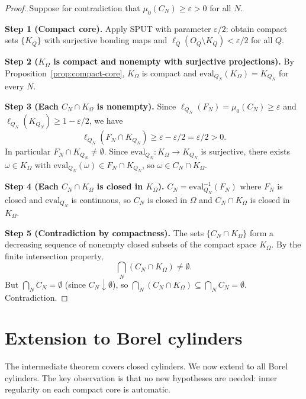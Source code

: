 \documentclass[11pt]{article}
\theoremstyle{definition}
\begin{document}
\begin{proof}
Suppose for contradiction that $\mu_0(C_N) \geq \varepsilon > 0$
for all $N$.

\textbf{Step 1 (Compact core).}
Apply SPUT with parameter $\varepsilon/2$: obtain compact sets
$\{K_Q\}$ with surjective bonding maps and $\ell_Q(O_Q \setminus
K_Q) < \varepsilon/2$ for all $Q$.

\textbf{Step 2 ($K_\Omega$ is compact and nonempty with surjective
projections).}
By Proposition~\ref{prop:compact-core}, $K_\Omega$ is compact and
$\mathrm{eval}_{Q_N}(K_\Omega) = K_{Q_N}$ for every $N$.

\textbf{Step 3 (Each $C_N \cap K_\Omega$ is nonempty).}
Since $\ell_{Q_N}(F_N) = \mu_0(C_N) \geq \varepsilon$ and
$\ell_{Q_N}(K_{Q_N}) \geq 1 - \varepsilon/2$, we have
\[
\ell_{Q_N}(F_N \cap K_{Q_N})
\geq
\varepsilon - \varepsilon/2 = \varepsilon/2 > 0.
\]
In particular $F_N \cap K_{Q_N} \neq \emptyset$.  Since
$\mathrm{eval}_{Q_N} : K_\Omega \to K_{Q_N}$ is surjective, there
exists $\omega \in K_\Omega$ with $\mathrm{eval}_{Q_N}(\omega) \in
F_N \cap K_{Q_N}$, so $\omega \in C_N \cap K_\Omega$.

\textbf{Step 4 (Each $C_N \cap K_\Omega$ is closed in $K_\Omega$).}
$C_N = \mathrm{eval}_{Q_N}^{-1}(F_N)$ where $F_N$ is closed and
$\mathrm{eval}_{Q_N}$ is continuous, so $C_N$ is closed in $\Omega$
and $C_N \cap K_\Omega$ is closed in $K_\Omega$.

\textbf{Step 5 (Contradiction by compactness).}
The sets $\{C_N \cap K_\Omega\}$ form a decreasing sequence of
nonempty closed subsets of the compact space $K_\Omega$.  By the
finite intersection property,
\[
\bigcap_N (C_N \cap K_\Omega) \neq \emptyset.
\]
But $\bigcap_N C_N = \emptyset$ (since $C_N \downarrow \emptyset$),
so $\bigcap_N (C_N \cap K_\Omega) \subseteq \bigcap_N C_N =
\emptyset$.  Contradiction.
\end{proof}

\section{Extension to Borel cylinders}\label{sec:borel}

The intermediate theorem covers closed cylinders.  We now extend to
all Borel cylinders.  The key observation is that no new hypotheses
are needed: inner regularity on each compact core is automatic.
\end{document}
